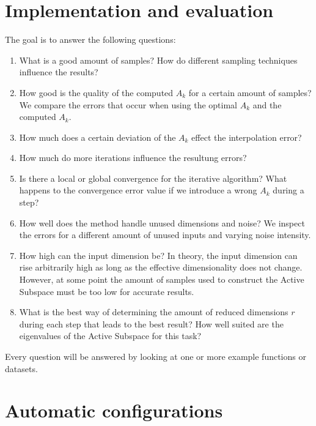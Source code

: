 \documentclass[
  a4paper,  %
  twoside,  %
  bibliography=totoc,
  headsepline,
  cleardoublepage=empty,
  parskip=half,
  draft=false
]{scrbook}
\begin{document}
\chapter{Implementation and evaluation}

The goal is to answer the following questions:

\begin{enumerate}
\item What is a good amount of samples? How do different sampling techniques influence the results?

\item How good is the quality of the computed $A_k$ for a certain amount of samples? We compare the errors that occur when using the optimal $A_k$ and the computed $A_k$.

\item How much does a certain deviation of the $A_k$ effect the interpolation error?

\item How much do more iterations influence the resultung errors?

\item Is there a local or global convergence for the iterative algorithm? What happens to the convergence error value if we introduce a wrong $A_k$ during a step?

\item How well does the method handle unused dimensions and noise? We inspect the errors for a different amount of unused inputs and varying noise intensity.

\item How high can the input dimension be? In theory, the input dimension can rise arbitrarily high as long as the effective dimensionality does not change. However, at some point the amount of samples used to construct the Active Subspace must be too low for accurate results.

\item What is the best way of determining the amount of reduced dimensions $r$ during each step that leads to the best result? How well suited are the eigenvalues of the Active Subspace for this task?
\end{enumerate}

Every question will be answered by looking at one or more example functions or datasets.

\chapter{Automatic configurations}
\end{document}
